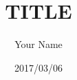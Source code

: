 \begin{titlepage}
\title{TITLE}
\date{2017/03/06}
\author{Your Name}
\maketitle
\thispagestyle{empty}
\end{titlepage}
